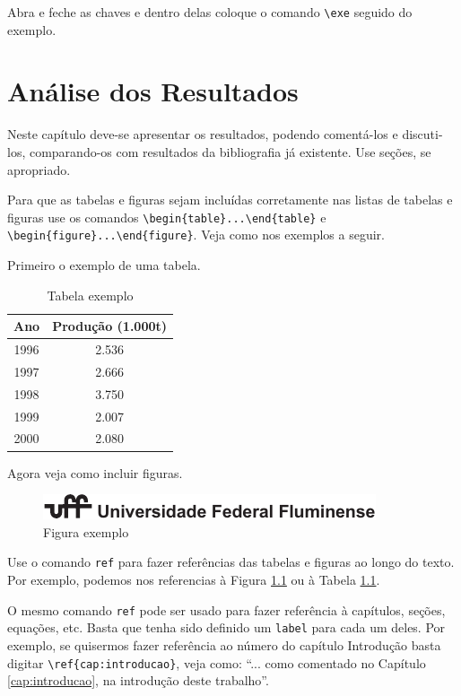\documentclass[12pt,a4paper,header]{abnt}
\begin{document}
{\exe
Abra e feche as chaves e dentro delas coloque o comando \verb|\exe| seguido do exemplo.
}




\chapter{Análise dos Resultados}


Neste capítulo deve-se apresentar os resultados, podendo comentá-los e discuti-los, comparando-os com resultados da bibliografia já existente. Use seções, se apropriado.

Para que as tabelas e figuras sejam incluídas corretamente nas listas de tabelas e figuras use os comandos 
\verb|\begin{table}...\end{table}| e \verb|\begin{figure}...\end{figure}|. Veja como nos exemplos a seguir.

Primeiro o exemplo de uma tabela. 

\begin{table}[h!]
\centering
\caption{Tabela exemplo} \label{fig:exemplo}
\begin{tabular}{cc}
\hline
Ano & Produção (1.000t)\\
\hline
1996 & 2.536\\
1997 & 2.666\\
1998 & 3.750\\
1999 & 2.007\\
2000 & 2.080\\
\hline
\end{tabular}
\end{table}

Agora veja como incluir figuras.

\begin{figure}[h!]
\centering
\includegraphics[width=0.5\linewidth]{logoUFF.pdf}
\caption{Figura exemplo} \label{tab:exemplo}
\end{figure}

Use o comando \verb|ref| para fazer referências das tabelas e figuras ao longo do texto. Por exemplo, podemos nos referencias à Figura \ref{fig:exemplo} ou à Tabela \ref{tab:exemplo}. 

O mesmo comando \verb|ref| pode ser usado para fazer referência à capítulos, seções, equações, etc. Basta que tenha sido definido um \verb|label| para cada um deles. Por exemplo, se quisermos fazer referência ao número do capítulo Introdução basta digitar \verb|\ref{cap:introducao}|, veja como: ``... como comentado no Capítulo \ref{cap:introducao}, na introdução deste trabalho''. 
\end{document}
